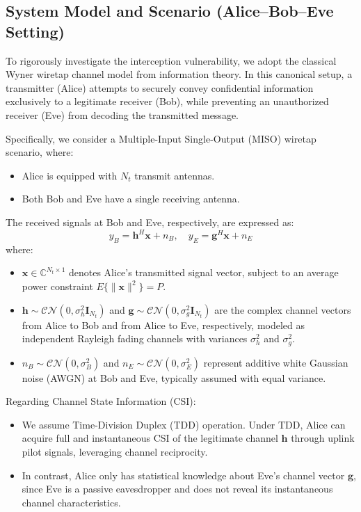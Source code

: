 \documentclass[10pt,a4paper]{article} %
\begin{document}
\subsection{System Model and Scenario (Alice--Bob--Eve Setting)}
To rigorously investigate the interception vulnerability, we adopt the classical Wyner wiretap channel model from information theory. In this canonical setup, a transmitter (Alice) attempts to securely convey confidential information exclusively to a legitimate receiver (Bob), while preventing an unauthorized receiver (Eve) from decoding the transmitted message.

Specifically, we consider a Multiple-Input Single-Output (MISO) wiretap scenario, where:
\begin{itemize}
    \item Alice is equipped with $N_t$ transmit antennas.
    \item Both Bob and Eve have a single receiving antenna.
\end{itemize}

The received signals at Bob and Eve, respectively, are expressed as:
\[
y_B = \mathbf{h}^{H} \mathbf{x} + n_B, \quad y_E = \mathbf{g}^{H} \mathbf{x} + n_E
\]
where:
\begin{itemize}
    \item $\mathbf{x} \in \mathbb{C}^{N_t \times 1}$ denotes Alice’s transmitted signal vector, subject to an average power constraint $E\{\|\mathbf{x}\|^2\} = P$.
    \item $\mathbf{h} \sim \mathcal{CN}(0, \sigma_h^2 \mathbf{I}_{N_t})$ and $\mathbf{g} \sim \mathcal{CN}(0, \sigma_g^2 \mathbf{I}_{N_t})$ are the complex channel vectors from Alice to Bob and from Alice to Eve, respectively, modeled as independent Rayleigh fading channels with variances $\sigma_h^2$ and $\sigma_g^2$.
    \item $n_B \sim \mathcal{CN}(0, \sigma_B^2)$ and $n_E \sim \mathcal{CN}(0, \sigma_E^2)$  represent additive white Gaussian noise (AWGN) at Bob and Eve, typically assumed with equal variance.
\end{itemize}

Regarding Channel State Information (CSI):
\begin{itemize}
    \item We assume Time-Division Duplex (TDD) operation. Under TDD, Alice can acquire full and instantaneous CSI of the legitimate channel $\mathbf{h}$ through uplink pilot signals, leveraging channel reciprocity.
    \item In contrast, Alice only has statistical knowledge about Eve’s channel vector $\mathbf{g}$, since Eve is a passive eavesdropper and does not reveal its instantaneous channel characteristics.
\end{itemize}
\end{document}
